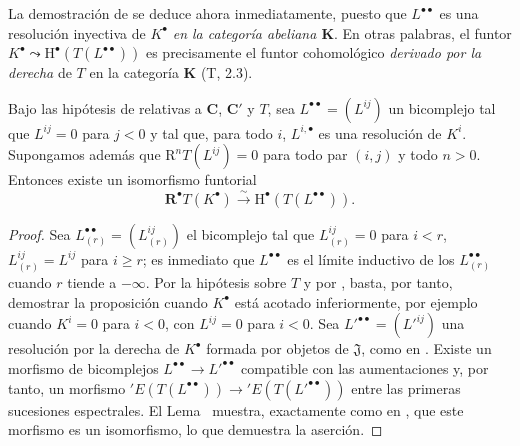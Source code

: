 \begin{env}[11.5.2.5]
\label{0.11.5.2.5}
\label{0.11.5.2.5-fr}
La demostración de  se deduce ahora inmediatamente, puesto que $L^{\bullet\bullet}$ es una resolución inyectiva de $K^\bullet$ \emph{en la categoría abeliana $\boldsymbol{K}$}.
En otras palabras, el funtor
$K^\bullet\leadsto\mathrm H^\bullet(T(L^{\bullet\bullet}))$
es precisamente el funtor cohomológico \emph{derivado por la derecha} de $T$ en la categoría $\boldsymbol{K}$ (T, 2.3).
\end{env}

\begin{proposition}[11.5.3]
\label{0.11.5.3}
\label{0.11.5.3-fr}
Bajo las hipótesis de \textup{} relativas a $\boldsymbol{C}$, $\boldsymbol{C}'$ y $T$, sea $L^{\bullet\bullet}=(L^{ij})$ un bicomplejo tal que $L^{ij}=0$ para $j<0$ y tal que, para todo $i$, $L^{i,\bullet}$ es una resolución de $K^i$.
Supongamos además que $\mathrm R^nT(L^{ij})=0$ para todo par $(i,j)$ y todo $n>0$.
Entonces existe un isomorfismo funtorial
\[
  \label{0.11.5.3.1-fr}
  \mathbf R^\bullet T(K^\bullet)\xrightarrow{\sim}
  \mathrm H^\bullet(T(L^{\bullet\bullet})).
  \tag{11.5.3.1}
\]
\end{proposition}

\begin{proof}
Sea $L_{(r)}^{\bullet\bullet}=(L_{(r)}^{ij})$ el bicomplejo tal que $L_{(r)}^{ij}=0$ para $i<r$, $L_{(r)}^{ij}=L^{ij}$ para $i\geq r$; es inmediato que $L^{\bullet\bullet}$ es el límite inductivo de los $L_{(r)}^{\bullet\bullet}$ cuando $r$ tiende a $-\infty$.
Por la hipótesis sobre $T$ y por , basta, por tanto, demostrar la proposición cuando $K^\bullet$ está acotado inferiormente, por ejemplo cuando $K^i=0$ para $i<0$, con $L^{ij}=0$ para $i<0$.
Sea $L'^{\bullet\bullet}=(L'^{ij})$ una resolución por la derecha de $K^\bullet$ formada por objetos de $\mathfrak J$, como en .
Existe un morfismo de bicomplejos
$L^{\bullet\bullet}\to L'^{\bullet\bullet}$
compatible con las aumentaciones y, por tanto, un morfismo
$'E(T(L^{\bullet\bullet}))\to{}'E(T(L'^{\bullet\bullet}))$
entre las primeras sucesiones espectrales.
El Lema~ muestra, exactamente como en , que este morfismo es un isomorfismo, lo que demuestra la aserción.
\end{proof}

